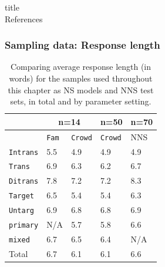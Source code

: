 \documentclass[handout,xcolor={dvipsnames}]{beamer}
\newcommand{\param}[1]{\texttt{#1}}
\begin{document}
\begin{beamercolorbox}{title}
\mbox{}\\[1ex]%
References
\end{beamercolorbox}
\medskip
\scriptsize



\begin{frame}
\frametitle{Sampling data: Response length}
\small
\begin{table}[htb!]
\begin{center}
\setlength{\tabcolsep}{.5em}
\begin{tabular}{|l||l|l|l||l|}
\hline
  & \multicolumn{2}{c|}{n=14} & n=50 & n=70\\
\hline
   & \param{Fam} & \param{Crowd} & \param{Crowd} 	& NNS			\\ \hline
\hline
\param{Intrans} & 5.5 	  		& 4.9 			& 4.9 		& 4.9 			\\ \hline
\param{Trans}   & 6.9          	& 6.3          	& 6.2       & 6.7    	    \\ \hline
\param{Ditrans} & 7.8          	& 7.2          	& 7.2       & 8.3    	    \\ \hline
\hline
\param{Target}  & 6.5 			& 5.4	 		& 5.4 		& 6.3			\\ \hline
\param{Untarg}  & 6.9        	& 6.8        	& 6.8    	& 6.9        	\\ \hline
\hline
\param{prim\-a\-ry} & N/A        	& 5.7 			& 5.8		& 6.6		 	\\ \hline
\param{mix\-ed}   & 6.7          	& 6.5          	& 6.4       & N/A	        \\ \hline
\hline
Total	& 6.7			& 6.1			& 6.1		& 6.6			\\ \hline
\end{tabular}
\caption{\label{tab:response-length}Comparing average response length (in words) for the samples used throughout this chapter as NS models and NNS test sets, in total and by parameter setting.
}
\end{center}
\end{table}

\end{frame}
\end{document}
